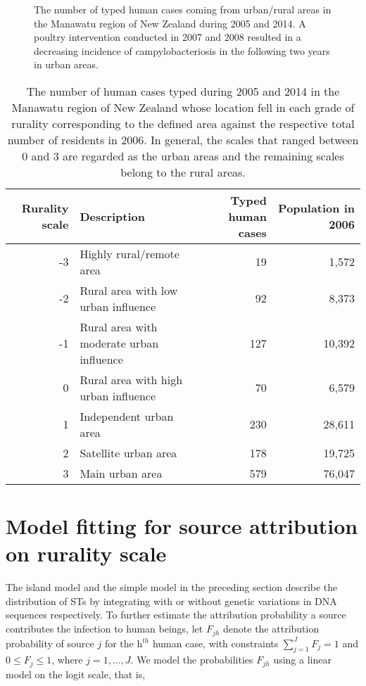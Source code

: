 \documentclass[times, doublespace]{WileyNJD-v2}%
\begin{document}
\begin{figure}
\centering
\caption{The number of typed human cases coming from urban/rural areas in the Manawatu region of New Zealand during 2005 and 2014. A poultry intervention conducted in 2007 and 2008 resulted in a decreasing incidence of campylobacteriosis in the following two years in urban areas.}
\label{fig1}
\end{figure}

\begin{table}
  \begin{center}
    \begin{tabular}{rlrr}
      \toprule
      Rurality scale & Description & Typed human cases & Population in 2006\\ \midrule
      -3 & Highly rural/remote area & 19 & 1,572\\
      -2 & Rural area with low urban influence & 92 & 8,373\\
      -1 & Rural area with moderate urban influence & 127 & 10,392\\
      0 & Rural area with high urban influence & 70 & 6,579\\
      1 & Independent urban area & 230 & 28,611\\
      2 & Satellite urban area & 178 & 19,725\\
      3 & Main urban area & 579 & 76,047 \\
      \bottomrule
    \end{tabular}
  \end{center}
  \caption{The number of human cases typed during 2005 and 2014 in the Manawatu region of New Zealand whose location fell in each grade of rurality corresponding to the defined area against the respective total number of residents in 2006. In general, the scales that ranged between 0 and 3 are regarded as the urban areas and the remaining scales belong to the rural areas.}
  \label{tab2}
\end{table}

\section{Model fitting for source attribution on rurality scale}
The island model and the simple model in the preceding section describe the distribution of STs by integrating with or without genetic variations in DNA sequences respectively. To further estimate the attribution probability a source contributes the infection to human beings, let $F_{jh}$ denote the attribution probability of source $j$ for the h$^{th}$ human case, with constraints $\sum_{j=1}^J F_j =1$ and $0 \leq F_j \leq 1$, where $j=1, \ldots, J$. We model the probabilities $F_{jh}$ using a linear model on the logit scale, that is,  
\end{document}
